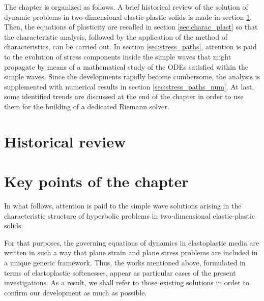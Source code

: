 The chapter is organized as follows.
A brief historical review of the solution of dynamic problems in two-dimensional elastic-plastic solids is made in section \ref{sec:review}.
Then, the equations of plasticity are recalled in section \ref{sec:charac_plast} so that the characteristic analysis, followed by the application of the method of characteristics, can be carried out.
In section \ref{sec:stress_paths}, attention is paid to the evolution of stress components inside the simple waves that might propagate by means of a mathematical study of the ODEs satisfied within the simple waves.
Since the developments rapidly become cumbersome, the analysis is supplemented with numerical results in section \ref{sec:stress_paths_num}.
At last, some identified trends are discussed at the end of the chapter in order to use them for the building of a dedicated Riemann solver. 

\section{Historical review}
\label{sec:review}



\section{Key points of the chapter}
In what follows, attention is paid to the simple wave solutions arising in the characteristic structure of hyperbolic problems in two-dimensional elastic-plastic solids.

For that purposes, the governing equations of dynamics in elastoplastic media are written in such a way that plane strain and plane stress problems are included in a unique generic framework.
Thus, the works mentioned above, formulated in terms of elastoplastic softenesses, appear as particular cases of the present investigations.
As a result, we shall refer to those existing solutions in order to confirm our development as much as possible.




